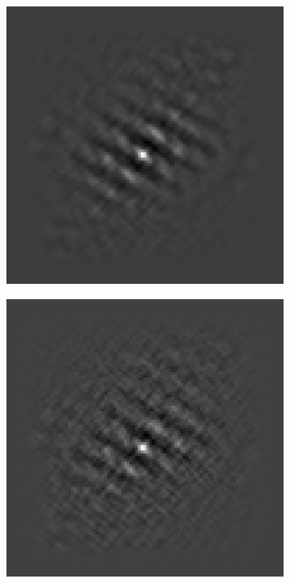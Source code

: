 \begin{figure}[htpb]
\begin{subfigure}{.25\textwidth}
\end{subfigure}%
\begin{subfigure}{.25\textwidth}
\includegraphics[width=1\textwidth]{img/GCsigma150}
\end{subfigure}%
\begin{subfigure}{.25\textwidth}
\includegraphics[width=1\textwidth]{img/GCsigma300}

\end{subfigure}
\end{figure}
